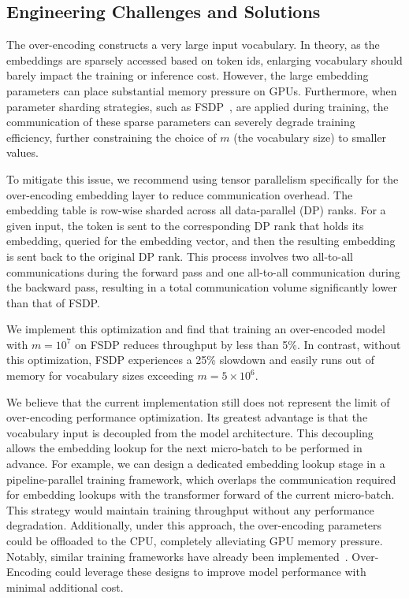 \subsection{Engineering Challenges and Solutions} 

The over-encoding constructs a very large input vocabulary. In theory, as the embeddings are sparsely accessed based on token ids, enlarging vocabulary should barely impact the training or inference cost. However, the large embedding parameters can place substantial memory pressure on GPUs. Furthermore, when parameter sharding strategies, such as FSDP~\cite{zhao2023pytorch}, are applied during training, the communication of these sparse parameters can severely degrade training efficiency, further constraining the choice of $m$ (the vocabulary size) to smaller values.

To mitigate this issue, we recommend using tensor parallelism specifically for the over-encoding embedding layer to reduce communication overhead. The embedding table is row-wise sharded across all data-parallel (DP) ranks. For a given input, the token is sent to the corresponding DP rank that holds its embedding, queried for the embedding vector, and then the resulting embedding is sent back to the original DP rank. This process involves two all-to-all communications during the forward pass and one all-to-all communication during the backward pass, resulting in a total communication volume significantly lower than that of FSDP.

We implement this optimization and find that training an over-encoded model with $m = 10^7$ on FSDP reduces throughput by less than 5\%. In contrast, without this optimization, FSDP experiences a 25\% slowdown and easily runs out of memory for vocabulary sizes exceeding $m = 5 \times 10^6$.

We believe that the current implementation still does not represent the limit of over-encoding performance optimization. Its greatest advantage is that the vocabulary input is decoupled from the model architecture. This decoupling allows the embedding lookup for the next micro-batch to be performed in advance. For example, we can design a dedicated embedding lookup stage in a pipeline-parallel training framework, which overlaps the communication required for embedding lookups with the transformer forward of the current micro-batch. This strategy would maintain training throughput without any performance degradation. 
Additionally, under this approach, the over-encoding parameters could be offloaded to the CPU, completely alleviating GPU memory pressure. Notably, similar training frameworks have already been implemented~\cite{fang2022frequency, colossal-ai}. Over-Encoding could leverage these designs to improve model performance with minimal additional cost.
